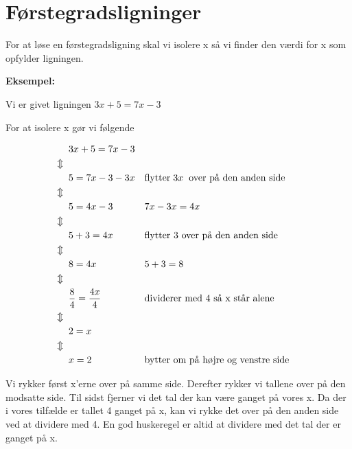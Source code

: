\section*{Førstegradsligninger}


For at løse en førstegradsligning skal vi isolere x så vi finder den værdi for x som opfylder ligningen.

\textbf{Eksempel:} 

Vi er givet ligningen $3x + 5 = 7x - 3$

For at isolere x gør vi følgende


\begin{align*}
&3x + 5 = 7x - 3\\
\Updownarrow \hspace*{2mm} &\\
& 5 = 7x - 3 - 3x  && \text{flytter} \hspace*{1mm} 3x \hspace*{2mm} \text{over på den anden side}\\
\Updownarrow \hspace*{2mm} &\\
& 5 = 4x - 3 && 7x - 3x = 4x\\
\Updownarrow \hspace*{2mm} &\\
& 5 + 3 = 4x && \text{flytter 3 over på den anden side}\\
\Updownarrow \hspace*{2mm} &\\
& 8 = 4x && 5 + 3 = 8\\
\Updownarrow \hspace*{2mm} &\\
&\frac{8}{4} = \frac{4x}{4} && \text{dividerer med 4 så x står alene}\\
\Updownarrow \hspace*{2mm} &\\
& 2 = x\\
\Updownarrow \hspace*{2mm} &\\
& x = 2 && \text{bytter om på højre og venstre side}
\end{align*}

Vi rykker først x'erne over på samme side. Derefter rykker vi tallene over på den modsatte side. Til sidst fjerner vi det tal der kan være ganget på vores x. Da der i vores tilfælde er tallet 4 ganget på x, kan vi rykke det over på den anden side ved at dividere med 4. En god huskeregel er altid at dividere med det tal der er ganget på x.


